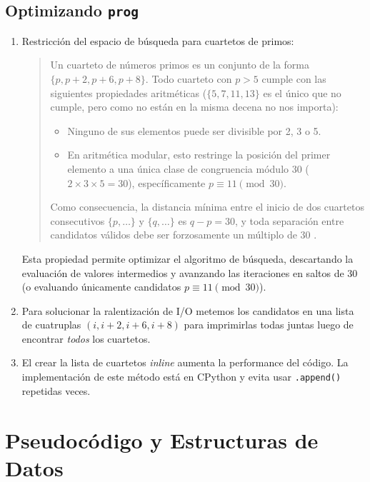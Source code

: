 \documentclass[12pt,a4paper]{article}
\begin{document}
\subsection{Optimizando \texttt{prog}}

\begin{enumerate}
  \item Restricción del espacio de búsqueda para cuartetos de primos:
  \begin{quote}
    Un cuarteto de números primos es un conjunto de la forma $\{p, p+2, p+6, p+8\}$. Todo cuarteto con $p > 5$ cumple con las siguientes propiedades aritméticas ($\{5, 7, 11, 13\}$ es el único que no cumple, pero como no están en la misma decena no nos importa):
    \begin{itemize}
      \item Ninguno de sus elementos puede ser divisible por 2, 3 o 5.
      \item En aritmética modular, esto restringe la posición del primer elemento a una única clase de congruencia módulo 30 ($2 \times 3 \times 5 = 30$), específicamente $p \equiv 11 \pmod{30}$.
    \end{itemize}
    Como consecuencia, la distancia mínima entre el inicio de dos cuartetos consecutivos $\{p, \dots\}$ y $\{q, \dots\}$ es $q - p = 30$, y toda separación entre candidatos válidos debe ser forzosamente un múltiplo de 30 \cite{wikipedia}.
  \end{quote}

  Esta propiedad permite optimizar el algoritmo de búsqueda, descartando la evaluación de valores intermedios y avanzando las iteraciones en saltos de 30 (o evaluando únicamente candidatos $p \equiv 11 \pmod{30}$).

  \item Para solucionar la ralentización de I/O metemos los candidatos en una lista de cuatruplas $(i, i+2, i+6, i+8)$ para imprimirlas todas juntas luego de encontrar \emph{todos} los cuartetos.

  \item El crear la lista de cuartetos \emph{inline} aumenta la performance del código. La implementación de este método está en CPython y evita usar \texttt{.append()} repetidas veces.
\end{enumerate}

\section{Pseudocódigo y Estructuras de Datos}
\end{document}
